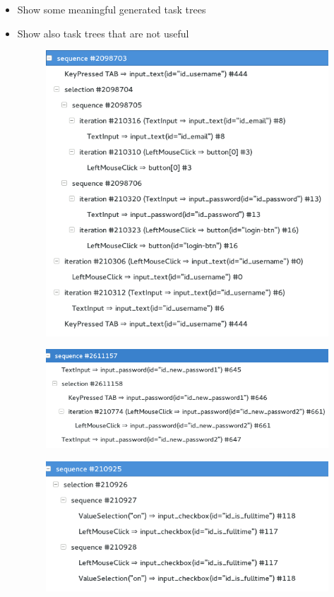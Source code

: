 \begin{itemize}
	\item Show some meaningful generated task trees
	\item Show also task trees that are not useful
\begin{figure}
	\centering
	\includegraphics[]{chapters/casestudy/mixedtasktree.png}
	\caption{}
	\label{}
\end{figure}
\begin{figure}
	\centering
	\includegraphics[]{chapters/casestudy/newpassword.png}
	\caption{}
	\label{}
\end{figure}
\begin{figure}
	\centering
	\includegraphics[]{chapters/casestudy/preprocessing_needed.png}

\end{figure}
\end{itemize}

